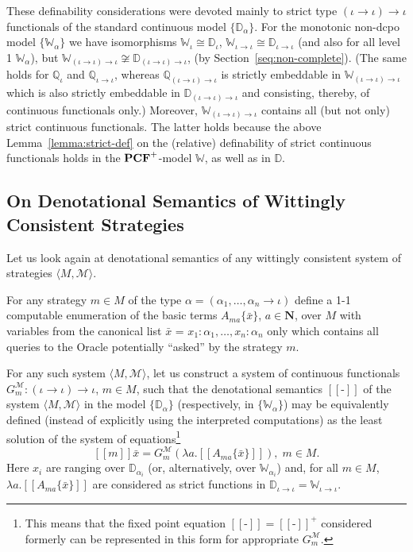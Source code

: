 \documentclass[fleqn]{LMCS}
\theoremstyle{plain}\newtheorem{satz}[thm]{Satz}
\theoremstyle{plain}\newtheorem{hyp}[thm]{Hypothesis}
\theoremstyle{plain}\newtheorem{hyps}[thm]{Hypotheses}
\theoremstyle{definition}\newtheorem{note}[thm]{Note}
\newcommand{\defis}{\mbox{-}}
\newcommand{\setof}[1]{\{#1\}}
\newcommand{\arr}{\rightarrow}
\newcommand{\la}{\langle}
\newcommand{\ra}{\rangle}
\newcommand{\Dsem}[1]{[\![ #1 ]\!]}
\newcommand{\tuple}[1]{\la #1 \ra}
\newcommand{\G}{G}
\newcommand{\NN}{\mathbf{N}}
\newcommand{\tbbQ}{\mathbb{Q}}\newcommand{\bbW}{\mathbb{W}}
\newcommand{\tbbW}{\mathbb{W}}\newcommand{\bbD}{\mathbb{D}}
\newcommand{\PCF}{\mbox{\bf PCF}}
\newcommand{\MM}{{\mathcal M}}
\newcommand{\bx}{\bar{x}}
\newcommand{\?}{\mbox{?}}
\begin{document}
\noindent
These definability considerations were devoted   
mainly to strict type 
\mbox{$(\iota\arr\iota)\arr\iota$} 
functionals of the standard continuous model $\setof{\bbD_{\alpha}}$. 
For the monotonic non-dcpo model $\setof{\tbbW_{\alpha}}$ we have isomorphisms   
$\tbbW_{\iota}\cong \bbD_{\iota}$, $\tbbW_{\iota\arr\iota}\cong \bbD_{\iota\arr\iota}$
(and also for all level 1 $\tbbW_\alpha$),
but 
$\tbbW_{(\iota\arr\iota)\arr\iota}\not\cong \bbD_{(\iota\arr\iota)\arr\iota}$, 
(by Section~\ref{seq:non-complete}). 
(The same holds for $\tbbQ_{\iota}$ and $\tbbQ_{\iota\arr\iota}$, 
whereas 
$\tbbQ_{(\iota\arr\iota)\arr\iota}$ is strictly embeddable in 
$\tbbW_{(\iota\arr\iota)\arr\iota}$ which is also strictly embeddable in 
$\bbD_{(\iota\arr\iota)\arr\iota}$ and consisting, thereby, of continuous 
functionals only.) 
Moreover,  $\tbbW_{(\iota\arr\iota)\arr\iota}$ contains all (but not only) 
strict continuous functionals. 
The latter holds because the above Lemma~\ref{lemma:strict-def} 
on the (relative) definability of strict continuous functionals holds 
in the $\PCF^+$-model $\tbbW$, as well as in $\bbD$.




\subsection{On Denotational Semantics of Wittingly Consistent Strategies}
\label{sec:den-sem-wit-strat}


\noindent
Let us look again at denotational semantics of 
any wittingly consistent 
system of strategies $\tuple{M,\MM}$. 


For any 
strategy $m\in M$ of the type 
$\alpha=(\alpha_1,\ldots,\alpha_n\arr\iota)$  
define a 1-1 computable enumeration 
of the basic terms  
$A_{ma}\setof{\bx}$, 
$a\in\NN$, over $M$ with variables from the canonical list 
$\bx$ = $x_1:\alpha_1,\ldots,x_n:\alpha_n$ only 
which contains all queries to the Oracle 
potentially ``asked'' by the strategy $m$.  

For any such system $\tuple{M,\MM}$, let us construct  
a system of  
continuous functionals 
$\G^{\MM}_m:(\iota\arr\iota)\arr\iota$, $m\in M$,  
such that the denotational 
semantics $\Dsem{\defis}$ of the system $\tuple{M,\MM}$ 
in the model $\{\bbD_{\alpha}\}$ (respectively, in $\{\tbbW_{\alpha}\}$) 
may be equivalently defined 
(instead of explicitly using the interpreted computations) 
as the least solution of the system of equations\footnote{This means that the fixed point equation 
$\Dsem{\defis}=\Dsem{\defis}^+$ considered formerly 
can be represented in this form for appropriate $\G^{\MM}_m$. 
}
\begin{equation}\label{eq:den-sem-w}
\Dsem{m}\bx=\G^{\MM}_{m}(\lambda a.\Dsem{A_{ma}\{\bx\}}),\; m\in M.
\end{equation}
Here $x_i$ are ranging over $\bbD_{\alpha_i}$ 
(or, alternatively, over $\tbbW_{\alpha_i}$) 
and, for all $m\in M$, $\lambda a.\Dsem{A_{ma}\{\bx\}}$ are considered 
as strict functions in $\bbD_{\iota\arr\iota}=\tbbW_{\iota\arr\iota}$. 
\end{document}
